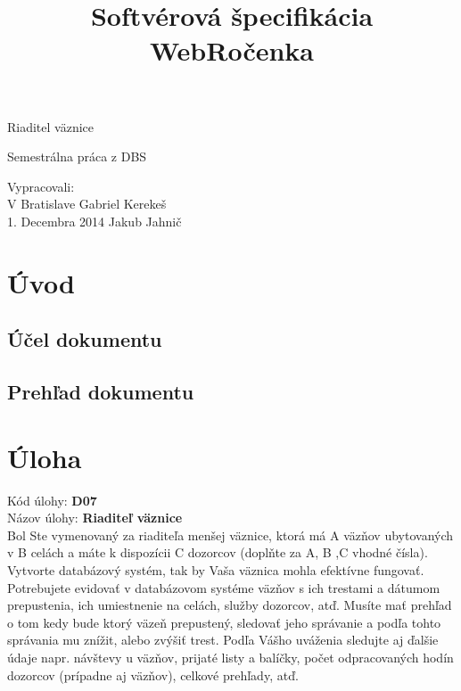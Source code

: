 \documentclass[slovak, 12pt, Times New Roman]{article}
\begin{document}
	\thispagestyle{fancy}
		\begin{center}\huge{Riaditel väznice\\\par}Semestrálna práca z DBS\end{center}
	\title{Softvérová špecifikácia WebRočenka}
	\date{}

	\begin{minipage}[b]{\textwidth}
	    \vspace{110mm}	 
	    \large   	\hspace{110mm} Vypracovali:\\
	    V Bratislave \hspace{82mm} Gabriel Kerekeš \\
	    1. Decembra 2014 \hspace{70mm} Jakub Jahnič \\
	    \vspace{-20mm} 
	\end{minipage}

	\clearpage
	\tableofcontents
	\clearpage

	\section{Úvod}
		\subsection{Účel dokumentu}
			
		\subsection{Prehľad dokumentu}
	\section{Úloha}
		Kód úlohy: \textbf{D07} \\
		Názov úlohy: \textbf{Riaditeľ väznice} \\

		Bol Ste vymenovaný za riaditeľa menšej väznice, ktorá má A väzňov ubytovaných v B celách a máte k dispozícii C dozorcov (doplňte za A, B
		,C vhodné čísla). Vytvorte databázový systém, tak by Vaša väznica mohla efektívne fungovať. Potrebujete evidovať v databázovom systéme 
		väzňov s ich trestami a dátumom prepustenia, ich umiestnenie na celách, služby dozorcov, atď. Musíte mať prehľad o tom kedy bude ktorý 
		väzeň prepustený, sledovať jeho správanie a podľa tohto správania mu znížit, alebo zvýšiť trest. Podľa Vášho uváženia sledujte aj 
		ďalšie údaje napr. návštevy u väzňov, prijaté listy a balíčky, počet odpracovaných hodín dozorcov (prípadne aj väzňov), celkové 
		prehľady, atď.
\end{document}
